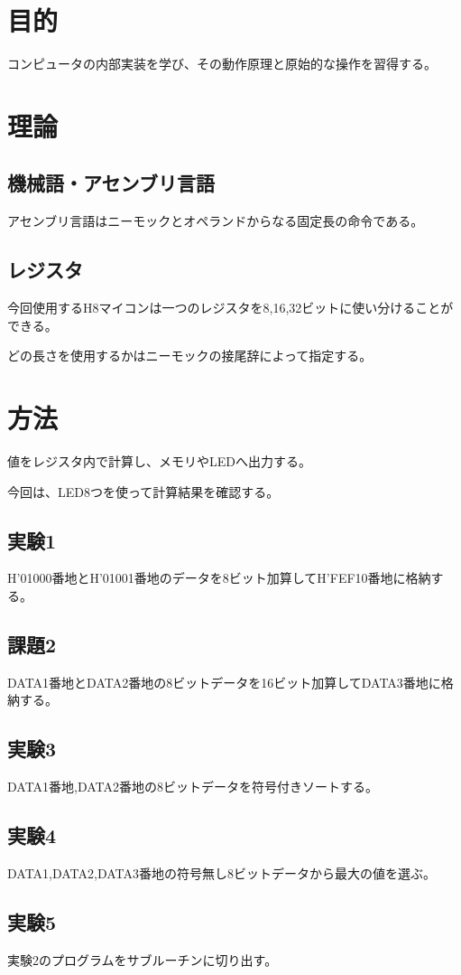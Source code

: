 \documentclass{jarticle}[2012/05/15]
\begin{document}
\section{目的}
コンピュータの内部実装を学び、その動作原理と原始的な操作を習得する。
\par
\section{理論}
\subsection{機械語・アセンブリ言語}
アセンブリ言語はニーモックとオペランドからなる固定長の命令である。
\par
\subsection{レジスタ}
今回使用するH8マイコンは一つのレジスタを8,16,32ビットに使い分けることができる。\par
どの長さを使用するかはニーモックの接尾辞によって指定する。
\par
\pagebreak

\section{方法}
値をレジスタ内で計算し、メモリやLEDへ出力する。\par
今回は、LED8つを使って計算結果を確認する。\par
\subsection{実験1}
H'01000番地とH'01001番地のデータを8ビット加算してH'FEF10番地に格納する。
\subsection{課題2}
DATA1番地とDATA2番地の8ビットデータを16ビット加算してDATA3番地に格納する。
\subsection{実験3}
DATA1番地,DATA2番地の8ビットデータを符号付きソートする。
\subsection{実験4}
DATA1,DATA2,DATA3番地の符号無し8ビットデータから最大の値を選ぶ。
\subsection{実験5}
実験2のプログラムをサブルーチンに切り出す。
\end{document}
